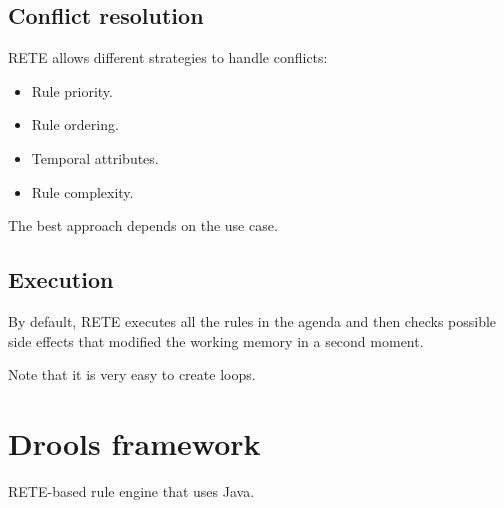 \subsection{Conflict resolution}
RETE allows different strategies to handle conflicts:
\begin{itemize}
    \item Rule priority.
    \item Rule ordering.
    \item Temporal attributes.
    \item Rule complexity.
\end{itemize}
The best approach depends on the use case.


\subsection{Execution}
By default, RETE executes all the rules in the agenda and 
then checks possible side effects that modified the working memory in a second moment.

Note that it is very easy to create loops.



\section{Drools framework}

RETE-based rule engine that uses Java.

